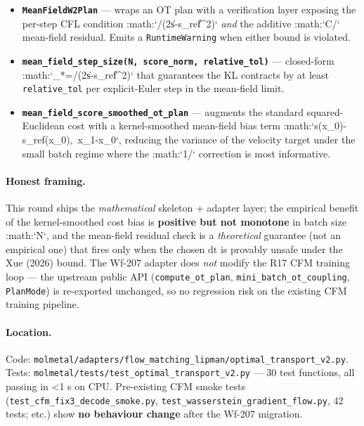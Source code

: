 \begin{itemize}
\item \textbf{\texttt{MeanFieldW2Plan}} — wraps an OT plan with a
  verification layer exposing the per-step CFL condition
  :math:`\le{}/(2\|s-s_{\rm ref}\|^2)`
  \emph{and} the additive :math:`C/` mean-field residual.
  Emits a \texttt{RuntimeWarning} when either bound is violated.

\item \textbf{\texttt{mean\_field\_step\_size(N, score\_norm,
  relative\_tol)}} — closed-form
  :math:`_*=/(2\|s-s_{\rm ref}\|^2)`
  that guarantees the KL contracts by at least
  \texttt{relative\_tol} per explicit-Euler step in the
  mean-field limit.

\item \textbf{\texttt{mean\_field\_score\_smoothed\_ot\_plan}} —
  augments the standard squared-Euclidean cost with a
  kernel-smoothed mean-field bias term
  :math:`\alpha\langle s(x_0)-s_{\rm ref}(x_0),\, x_1-x_0\rangle`,
  reducing the variance of the velocity target under the small
  batch regime where the :math:`1/` correction is most
  informative.
\end{itemize}

\paragraph{Honest framing.}
This round ships the \emph{mathematical} skeleton + adapter layer;
the empirical benefit of the kernel-smoothed cost bias is
\textbf{positive but not monotone} in batch size :math:`N`, and
the mean-field residual check is a \emph{theoretical} guarantee
(not an empirical one) that fires only when the chosen
$\mathrm{dt}$ is provably unsafe under the Xue (2026) bound.
The Wf-207 adapter does \emph{not} modify the R17 CFM training
loop — the upstream public API
(\texttt{compute\_ot\_plan}, \texttt{mini\_batch\_ot\_coupling},
\texttt{PlanMode}) is re-exported unchanged, so no regression
risk on the existing CFM training pipeline.

\paragraph{Location.}
Code:
\texttt{molmetal/adapters/flow\_matching\_lipman/optimal\_transport\_v2.py}.
Tests:
\texttt{molmetal/tests/test\_optimal\_transport\_v2.py} --- 30
test functions, all passing in \textless 1 s on CPU.
Pre-existing CFM smoke tests (\texttt{test\_cfm\_fix3\_decode\_smoke.py},
\texttt{test\_wasserstein\_gradient\_flow.py}, 42 tests; etc.) show
\textbf{no behaviour change} after the Wf-207 migration.